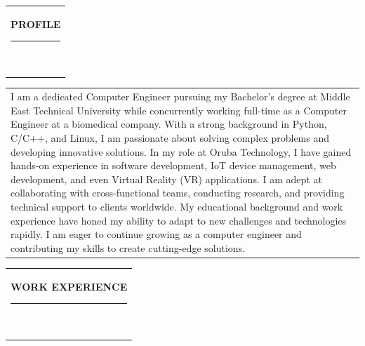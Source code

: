 \documentclass[10pt,A4]{article}
\newcommand{\mpwidth}{\linewidth-\fboxsep-\fboxsep}
\newcommand{\cvtext}[1] {
	\begin{tabular*}{1\mpwidth}{p{0.98\mpwidth}}
		\parbox{1\mpwidth}{\fontsize{8}{11}\selectfont #1}
	\end{tabular*}
}
\newcommand{\cvsection}[1] {
	\vspace{10pt}
	\cvtext{
		\textbf{\LARGE{\textcolor{darkcol}{\uppercase{#1}}}}\\[-4pt]
		\textcolor{maincol}{ \rule{0.1\textwidth}{2pt} } \\
	}
}
\begin{document}
\begin{paracol}{2}
\begin{rightcolumn}
\vfill\null
\cvsection{PROFILE}

\cvtext{ I am a dedicated Computer Engineer pursuing my Bachelor's degree at Middle East Technical University while concurrently working full-time as a Computer Engineer at a biomedical company. With a strong background in Python, C/C++, and Linux, I am passionate about solving complex problems and developing innovative solutions. In my role at Oruba Technology, I have gained hands-on experience in software development, IoT device management, web development, and even Virtual Reality (VR) applications. I am adept at collaborating with cross-functional teams, conducting research, and providing technical support to clients worldwide. My educational background and work experience have honed my ability to adapt to new challenges and technologies rapidly. I am eager to continue growing as a computer engineer and contributing my skills to create cutting-edge solutions. \\
}

\vfill\null
\cvsection{WORK EXPERIENCE}


\end{rightcolumn}
\end{paracol}
\end{document}
